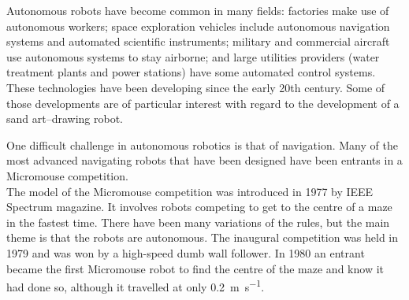 \label{history of robotics}
    Autonomous robots have become common in many fields: factories make use of autonomous workers; space exploration vehicles include autonomous navigation systems and automated scientific instruments; military and commercial aircraft use autonomous systems to stay airborne; and large utilities providers (\eg water treatment plants and power stations) have some automated control systems.\\
    These technologies have been developing since the early 20th century. Some of those developments are of particular interest with regard to the development of a sand art--drawing robot.

    One difficult challenge in autonomous robotics is that of navigation. Many of the most advanced navigating robots that have been designed have been entrants in a Micromouse competition.\\
    The model of the Micromouse competition was introduced in 1977 by IEEE Spectrum magazine.\cite{harrison2010} It involves robots competing to get to the centre of a maze in the fastest time. There have been many variations of the rules, but the main theme is that the robots are autonomous. The inaugural competition was held in 1979 and was won by a high-speed dumb wall follower. In 1980 an entrant became the first Micromouse robot to find the centre of the maze and know it had done so, although it travelled at only \SI{0.2}{\meter\per\second}.

